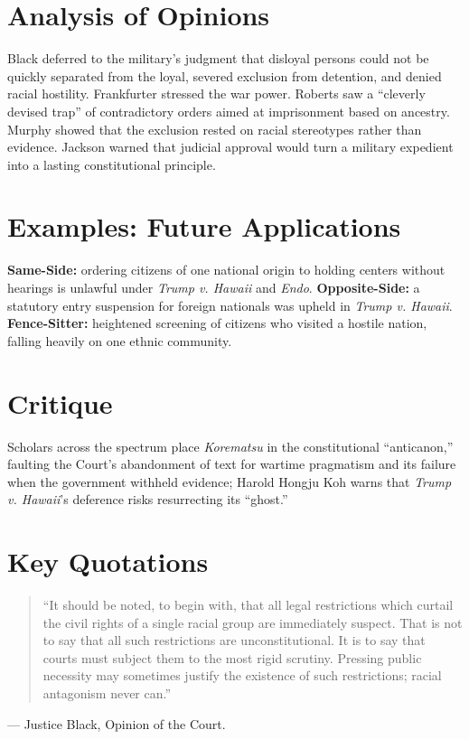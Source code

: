 \documentclass[12pt]{article}
\begin{document}
\section{Analysis of Opinions}
Black deferred to the military's judgment that disloyal persons could not be quickly separated from the loyal, severed exclusion from detention, and denied racial hostility. Frankfurter stressed the war power. Roberts saw a ``cleverly devised trap'' of contradictory orders aimed at imprisonment based on ancestry. Murphy showed that the exclusion rested on racial stereotypes rather than evidence. Jackson warned that judicial approval would turn a military expedient into a lasting constitutional principle.

\section{Examples: Future Applications}
\textbf{Same-Side:} ordering citizens of one national origin to holding centers without hearings is unlawful under \textit{Trump v. Hawaii} and \textit{Endo}. \textbf{Opposite-Side:} a statutory entry suspension for foreign nationals was upheld in \textit{Trump v. Hawaii}. \textbf{Fence-Sitter:} heightened screening of citizens who visited a hostile nation, falling heavily on one ethnic community.

\section{Critique}
Scholars across the spectrum place \textit{Korematsu} in the constitutional ``anticanon,'' faulting the Court's abandonment of text for wartime pragmatism and its failure when the government withheld evidence; Harold Hongju Koh warns that \textit{Trump v. Hawaii}'s deference risks resurrecting its ``ghost.''

\section{Key Quotations}
\begin{quote}
``It should be noted, to begin with, that all legal restrictions which curtail the civil rights of a single racial group are immediately suspect. That is not to say that all such restrictions are unconstitutional. It is to say that courts must subject them to the most rigid scrutiny. Pressing public necessity may sometimes justify the existence of such restrictions; racial antagonism never can.''
\end{quote}
\noindent --- Justice Black, Opinion of the Court.
\end{document}
